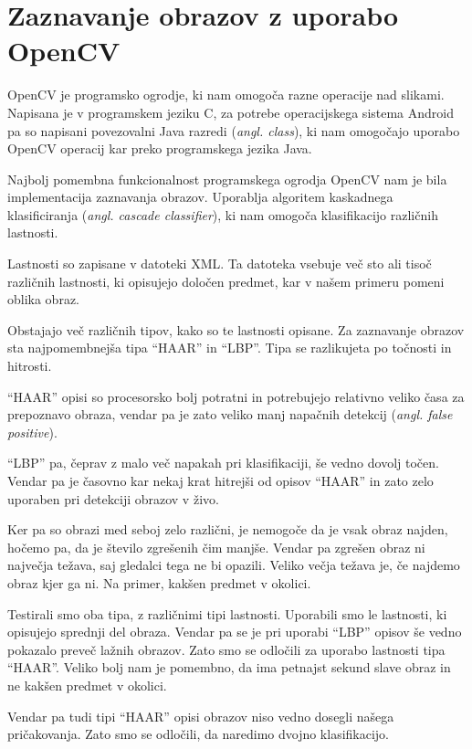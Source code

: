 \section{Zaznavanje obrazov z uporabo OpenCV}
OpenCV je programsko ogrodje, ki nam omogoča razne operacije nad slikami.
Napisana je v programskem jeziku C, za potrebe operacijskega sistema Android
pa so napisani povezovalni Java razredi (\textit{angl. class}), ki nam
omogočajo uporabo OpenCV operacij kar preko programskega jezika Java.

Najbolj pomembna funkcionalnost programskega ogrodja OpenCV nam je bila
implementacija zaznavanja obrazov. Uporablja algoritem kaskadnega
klasificiranja (\textit{angl. cascade classifier}), ki nam omogoča
klasifikacijo različnih lastnosti.

Lastnosti so zapisane v datoteki XML. Ta datoteka vsebuje več sto ali tisoč
različnih lastnosti, ki opisujejo določen predmet, kar v našem primeru pomeni
oblika obraz.

Obstajajo več različnih tipov, kako so te lastnosti opisane. Za zaznavanje
obrazov sta najpomembnejša tipa ``HAAR'' in ``LBP''. Tipa se razlikujeta po
točnosti in hitrosti.

``HAAR'' opisi so procesorsko bolj potratni in potrebujejo relativno veliko
časa za prepoznavo obraza, vendar pa je zato veliko manj napačnih detekcij
(\textit{angl. false positive}).

``LBP'' pa, čeprav z malo več napakah pri klasifikaciji, še vedno dovolj
točen. Vendar pa je časovno kar nekaj krat hitrejši od opisov ``HAAR'' in zato
zelo uporaben pri detekciji obrazov v živo.

Ker pa so obrazi med seboj zelo različni, je nemogoče da je vsak obraz najden,
hočemo pa, da je število zgrešenih čim manjše. Vendar pa zgrešen obraz ni
največja težava, saj gledalci tega ne bi opazili. Veliko večja težava je, če
najdemo obraz kjer ga ni. Na primer, kakšen predmet v okolici.

Testirali smo oba tipa, z različnimi tipi lastnosti. Uporabili smo le
lastnosti, ki opisujejo sprednji del obraza. Vendar pa se je pri uporabi
``LBP'' opisov še vedno pokazalo preveč lažnih obrazov. Zato smo se odločili
za uporabo lastnosti tipa ``HAAR''. Veliko bolj nam je pomembno, da ima
petnajst sekund slave obraz in ne kakšen predmet v okolici.

Vendar pa tudi tipi ``HAAR'' opisi obrazov niso vedno dosegli našega
pričakovanja. Zato smo se odločili, da naredimo dvojno klasifikacijo.

